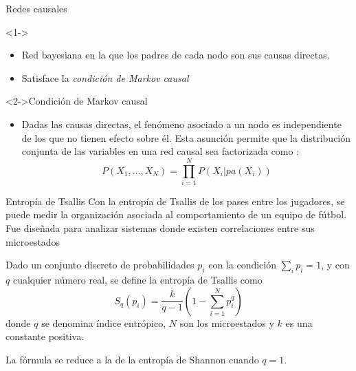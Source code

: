 \documentclass{beamer}
\begin{document}
\begin{frame}{Redes causales}
   \begin{block}
        <1->{}
            \begin{itemize}
                \item Red bayesiana en la que los padres de cada nodo son sus causas directas.
                \item Satisface la {\em condición de Markov causal}
            \end{itemize}
    \end{block}
    \begin{exampleblock}
        <2->{Condición de Markov causal}
            \begin{itemize}
                \item Dadas las causas directas, el fenómeno asociado a un nodo es independiente de 
                los que no tienen efecto sobre él. Esta asunción permite que la distribución 
                conjunta de las variables en una red causal sea factorizada como :
                $$ P(X_{1}, \dots,X_{N}) = \prod_{i=1}^{N} P(X_{i} | pa(X_{i}))$$ 
            \end{itemize}
    \end{exampleblock}
\end{frame}

\begin{frame}{Entropía de Tsallis}
Con la entropía de Tsallis de los pases entre los jugadores, se puede medir la organización asociada al 
comportamiento de un equipo de fútbol. Fue diseñada para analizar sistemas donde existen correlaciones 
entre sus microestados
	\begin{definition} 
	Dado un conjunto discreto de probabilidades ${p_i}$ con la condición $\sum_{i} p_i = 1$, y con $q$ 
	cualquier número real, se define la entropía de Tsallis como
	$$ S_q(p_i)=\frac{k}{q-1}\left(1- \sum_{i=1}^{N}p_{i}^{q}\right)$$
	donde $q$ se denomina índice entrópico, $N$ son los microestados y $k$ es una constante positiva.
	\end{definition}
La fórmula se reduce a la de la entropía de Shannon cuando $q=1$.
\end{frame}

\end{document}
